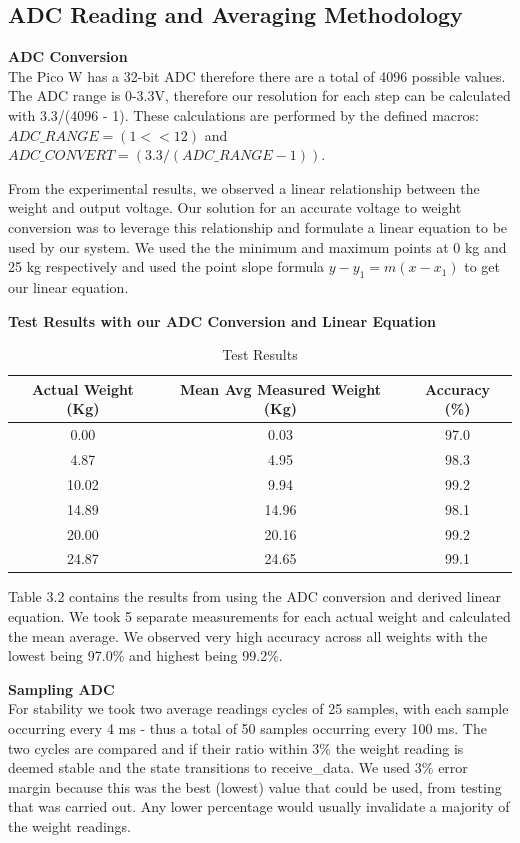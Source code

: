 \subsection{ADC Reading and Averaging Methodology}
\textbf{ADC Conversion}\\
The Pico W has a 32-bit ADC therefore there are a total of 4096 possible values. The ADC range is 0-3.3V, therefore our resolution for each step can be calculated with 3.3/(4096 - 1). These calculations are performed by the defined macros: $ADC\_RANGE = (1 << 12)$ and $ADC\_CONVERT = (3.3 / (ADC\_RANGE - 1))$.

From the experimental results, we observed a linear relationship between the weight and output voltage. Our solution for an accurate voltage to weight conversion was to leverage this relationship and formulate a linear equation to be used by our system. We used the the minimum and maximum points at 0 kg and 25 kg respectively and used the point slope formula $y - y_1 = m(x - x_1)$ to get our linear equation.

\begin{center}
    \textbf{Test Results with our ADC Conversion and Linear Equation} 
\end{center}
\begin{table}[h]
    \centering
    \begin{tabular}{|c|c|c|}
        \hline
        Actual Weight (Kg) & Mean Avg Measured Weight (Kg) & Accuracy (\%) \\
        \hline
        0.00 & 0.03 & 97.0\\
        4.87 & 4.95 & 98.3\\
        10.02 & 9.94 & 99.2\\
        14.89 & 14.96 & 98.1\\
        20.00 & 20.16 & 99.2\\
        24.87 & 24.65 & 99.1\\
        \hline
    \end{tabular}
    \caption{Test Results}
    \label{tab:adc_table}
\end{table}

Table 3.2 contains the results from using the ADC conversion and derived linear equation. We took 5 separate measurements for each actual weight and calculated the mean average. We observed very high accuracy across all weights with the lowest being 97.0\% and highest being 99.2\%. 

\textbf{Sampling ADC}\\
For stability we took two average readings cycles of 25 samples, with each sample occurring every 4 ms - thus a total of 50 samples occurring every 100 ms. The two cycles are compared and if their ratio within 3\% the weight reading is deemed stable and the state transitions to receive\_data. We used 3\% error margin because this was the best (lowest) value that could be used, from testing that was carried out. Any lower percentage would usually invalidate a majority of the weight readings.


